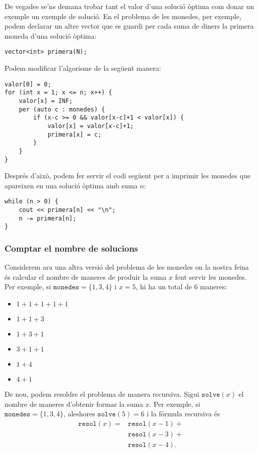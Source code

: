 De vegades se'ns demana trobar tant el valor
d'una solució òptima com donar un exemple
un exemple de solució.
En el problema de les monedes, per exemple,
podem declarar un altre vector
que es guardi per
cada suma de diners la primera moneda
d'una solució òptima:
\begin{lstlisting}
vector<int> primera(N);
\end{lstlisting}
Podem modificar l'algorisme de la següent manera:
\begin{lstlisting}
valor[0] = 0;
for (int x = 1; x <= n; x++) {
    valor[x] = INF;
    per (auto c : monedes) {
        if (x-c >= 0 && valor[x-c]+1 < valor[x]) {
            valor[x] = valor[x-c]+1;
            primera[x] = c;
        }
    }
}
\end{lstlisting}
Després d'això, podem fer servir el codi següent
per a imprimir les monedes que apareixen en una solució òptima amb
suma $n$:
\begin{lstlisting}
while (n > 0) {
    cout << primera[n] << "\n";
    n -= primera[n];
}
\end{lstlisting}

\subsubsection{Comptar el nombre de solucions}

Considerem ara una altra versió
del problema de les monedes on la nostra feina és
calcular el nombre de maneres
de produir la suma $x$ fent servir les monedes.
Per exemple, si $\texttt{monedes}=\{1,3,4\}$ i
$x=5$, hi ha un total de 6 maneres:

\begin{multicols}{2}
\begin{itemize}
\item $1+1+1+1+1$
\item $1+1+3$
\item $1+3+1$
\item $3+1+1$
\item $1+4$
\item $4+1$
\end{itemize}
\end{multicols}

De nou, podem resoldre el problema de manera recursiva.
Sigui $\texttt{solve}(x)$ el nombre de maneres
d'obtenir formar la suma $x$.
Per exemple, si $\texttt{monedes}=\{1,3,4\}$,
aleshores $\texttt{solve}(5)=6$ i la fórmula recursiva és
\begin{equation}
\begin{split}
\texttt{resol}(x) = & \texttt{resol}(x-1) + \\
                    & \texttt{resol}(x-3) + \\
                    & \texttt{resol}(x-4) .
\end{split}
\end{equation}

